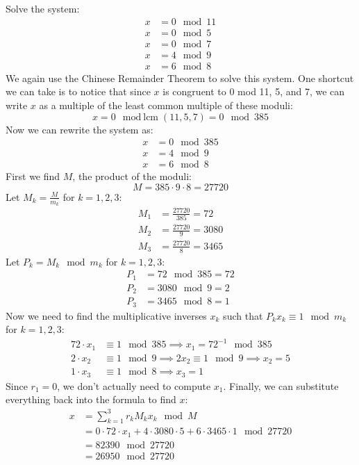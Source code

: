 \documentclass[12pt]{exam}
\begin{document}
\begin{questions}
\newpage 
\question 
Solve the system: 
\begin{align*}
x &= 0 \mod 11\\
x &= 0 \mod 5\\
x &= 0 \mod 7\\
x &= 4 \mod 9\\
x &= 6 \mod 8
\end{align*}
We again use the Chinese Remainder Theorem to solve this system.
One shortcut we can take is to notice that since $x$ is congruent to 0 mod 11, 5, and 7,
we can write $x$ as a multiple of the least common multiple of these moduli:
\[
  x = 0 \mod \text{lcm}(11, 5, 7) = 0 \mod 385
\]
Now we can rewrite the system as:
\begin{align*}
x &= 0 \mod 385\\
x &= 4 \mod 9\\
x &= 6 \mod 8
\end{align*}
First we find $M$, the product of the moduli:
\[
M = 385 \cdot 9 \cdot 8 = 27720
\]
Let $M_k = \frac{M}{m_k}$ for $k=1,2,3$:
\begin{align*}
M_1 &= \frac{27720}{385} = 72\\
M_2 &= \frac{27720}{9} = 3080\\
M_3 &= \frac{27720}{8} = 3465
\end{align*}
Let $P_k = M_k \mod m_k$ for $k=1,2,3$:
\begin{align*}
P_1 &= 72 \mod 385 = 72\\
P_2 &= 3080 \mod 9 = 2\\
P_3 &= 3465 \mod 8 = 1
\end{align*}
Now we need to find the multiplicative inverses $x_k$ 
such that $P_k x_k \equiv 1 \mod m_k$ for $k=1,2,3$:
\begin{align*}
72 \cdot x_1 &\equiv 1 \mod 385 \implies x_1 = 72^{-1} \mod 385\\
2 \cdot x_2 &\equiv 1 \mod 9 \implies 2x_2 \equiv 1 \mod 9 \implies x_2 = 5\\
1 \cdot x_3 &\equiv 1 \mod 8 \implies x_3 = 1
\end{align*}
Since $r_1 = 0$, we don't actually need to compute $x_1$.
Finally, we can substitute everything back into the formula to find $x$:
\begin{align*}
x &= \sum_{k=1}^3 r_k M_k x_k \mod M\\
&= 0 \cdot 72 \cdot x_1 + 4 \cdot 3080 \cdot 5 + 6 \cdot 3465 \cdot 1 \mod 27720\\
&= 82390 \mod 27720\\
&= 26950 \mod 27720
\end{align*}

\end{questions}
\end{document}
